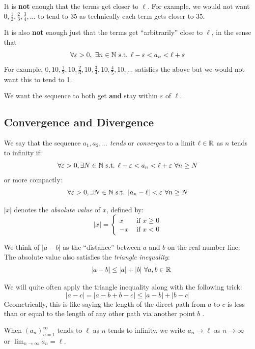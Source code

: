\documentclass[../main.tex]{subfiles}
\begin{document}
It is \textbf{not} enough that the terms get closer to $\ell$.
For example, we would not want $0, \frac{1}{2}, \frac{2}{3}, \frac{3}{4}, \ldots$ to tend to 35 as technically each term gets closer to 35.

It is also \textbf{not} enough just that the terms get ``arbitrarily'' close to $\ell$, in the sense that
\[
  \forall \varepsilon > 0,\ \exists n \in \mathbb{N} \text{ s.t. } \ell -\varepsilon < a_n < \ell + \varepsilon
\]
For example, $0, 10, \frac{1}{2}, 10, \frac{2}{3}, 10, \frac{3}{4}, 10, \frac{4}{5}, 10, \ldots$ satisfies the above but we would not want this to tend to 1.

We want the sequence to both get \textbf{and} stay within $\varepsilon$ of $\ell$.
\subsection{Convergence and Divergence}
\begin{definition}[Convergence]
  We say that the sequence $a_1, a_2, \ldots$ \textit{tends} or \textit{converges} to a limit $\ell \in \mathbb{R}$ as $n$ tends to infinity if: \label{convergenceDef}
  \[
    \forall\varepsilon > 0, \exists N \in \N \text{ s.t. } \ell - \varepsilon < a_n < \ell + \varepsilon\ \forall n \geq N
  \]
  or more compactly:
  \[
    \forall \varepsilon > 0, \exists N \in \mathbb{N} \text{ s.t. } |a_n - \ell| < \varepsilon\ \forall n \geq N
  \]
\end{definition}
\begin{remark}[Notation]
  $|x|$ denotes the \textit{absolute value} of $x$, defined by:
  \[
    |x| = \begin{cases}
    x & \text{ if } x\geq 0 \\
    -x & \text{ if } x< 0
    \end{cases}
  \]
\end{remark}
We think of $|a - b|$ as the ``distance'' between $a$ and $b$ on the real number line.
The absolute value also satisfies the \textit{triangle inequality}:
\[
  \quad |a - b| \leq |a| + |b|\ \forall a, b \in \mathbb{R}
\]
\begin{remark}
  We will quite often apply the triangle inequality along with the following trick:
  \[
    |a - c| = |a - b + b - c| \leq |a - b| + |b - c|
  \]
  Geometrically, this is like saying the length of the direct path from $a$ to $c$ is less than or equal to the length of any other path via another point $b$ .
\end{remark}
\begin{remark}[Notation]
When $(a_n)^{\infty}_{n = 1}$ tends to $\ell$ as $n$ tends to infinity, we write $a_n \to \ell$ as $n \to \infty$ or $\displaystyle\lim_{n \to \infty} a_n = \ell$.
\end{remark}
\end{document}
